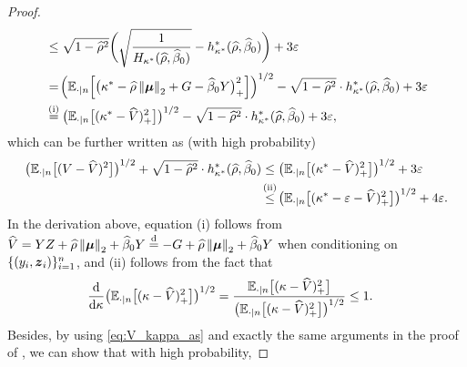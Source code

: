 \begin{proof}
\begin{align*}
        & \le \sqrt{1 - \hat\rho^2} \biggl( \sqrt{ \frac{1}{H_{\kappa^*}(\hat\rho, \hat\beta_0)} } - h_{\kappa^*}^*(\hat\rho, \hat\beta_0) \biggr) + 3\varepsilon \\
        & = \! \left( \E_{\cdot | n}\! \left[ \bigl(  \kappa^* - \hat\rho \norm{\bmu}_2 + G - \hat\beta_0 Y \bigr)_+^2 \right] \right)^{1/2}
        - \sqrt{1 - \hat\rho^2} \cdot h_{\kappa^*}^*(\hat\rho, \hat\beta_0) 
        + 3\varepsilon \\
        & \overset{\mathmakebox[0pt][c]{\text{(i)}}}{=} \bigl( \E_{\cdot | n}\bigl[(\kappa^* - \hat V)_+^2 \bigr] \bigr)^{1/2}
        - \sqrt{1 - \hat\rho^2} \cdot h_{\kappa^*}^*(\hat\rho, \hat\beta_0) 
        + 3\varepsilon,
\end{align*}
which can be further written as (with high probability)
\begin{align}
        \bigl( \E_{\cdot | n}\bigl[(V - \hat V)^2\bigr] \bigr)^{1/2} + \sqrt{1 - \hat\rho^2} \cdot h_{\kappa^*}^*(\hat\rho, \hat\beta_0) 
        & \le
        \bigl( \E_{\cdot | n}\bigl[(\kappa^* - \hat V)_+^2\bigr] \bigr)^{1/2}
        + 3\varepsilon \notag  \\
        & \overset{\mathmakebox[0pt][c]{\text{(ii)}}}{\le} 
        \bigl( \E_{\cdot | n}\bigl[(\kappa^* - \varepsilon - \hat V)_+^2\bigr] \bigr)^{1/2}
        + 4\varepsilon.
        \label{eq:V_diff2}
\end{align}
In the derivation above, equation (i) follows from $\hat V = YZ + \hat\rho \norm{\vmu}_2 + \hat\beta_0 Y 
\overset{\mathmakebox[0pt][c]{\mathrm{d}}}{=} -G + \hat\rho \norm{\vmu}_2 + \hat\beta_0 Y$ when conditioning on $\{(y_i, \text{\boldmath $z$}_i)\}_{i = 1}^n$, and (ii) follows from the fact that
\begin{equation*}
    \begin{aligned}
        \frac{\textup{d}}{\textup{d} \kappa}  \bigl( \mathbb{E}_{\cdot | n}\bigl[(\kappa - \widehat V)_+^2\bigr] \bigr)^{1/2}
        & = \frac{
            \mathbb{E}_{\cdot | n}\bigl[(\kappa - \widehat V)_+^2\bigr]
        }{
            \bigl( \mathbb{E}_{\cdot | n}\bigl[(\kappa - \widehat V)_+^2\bigr] \bigr)^{1/2}
        }
        \le 1.
    \end{aligned}
\end{equation*}
Besides, by using \cref{eq:V_kappa_as} and exactly the same arguments in the proof of \cite[Theorem 4.6]{montanari2022overparametrizedlineardimensionalityreductions}, we can show that with high probability,

\end{proof}
